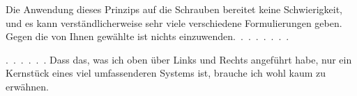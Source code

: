 %
Die Anwendung dieses Prinzips auf die Schrauben bereitet keine Schwierigkeit, und es kann verständlicherweise sehr viele verschiedene Formulierungen geben. Gegen die von Ihnen gewählte ist nichts einzuwenden.~\mbox{.\ .\ .\ .\ .\ .\ .}

\mbox{.\ .\ .\ .\ .\ .} Dass das, was ich oben über Links und Rechts angeführt habe, nur ein Kernstück eines viel umfassenderen Systems ist, brauche ich wohl kaum zu erwähnen.

\par\bigskip
